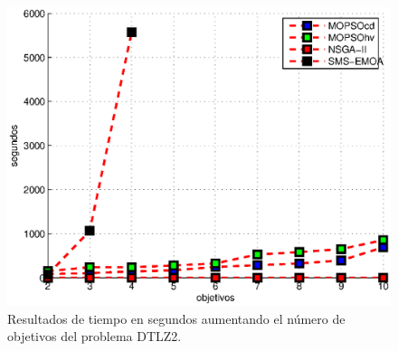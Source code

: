   \begin{figure}
      \begin{center}
	  \includegraphics[scale=1]{Cap4/tiempoEscala.eps}
      \end{center}
	\caption[Tiempos en escalamiento para el problema DTLZ2.]{Resultados de tiempo en segundos aumentando el n\'umero de objetivos del problema DTLZ2.}
      \label{fig:tescala}
  \end{figure}

 